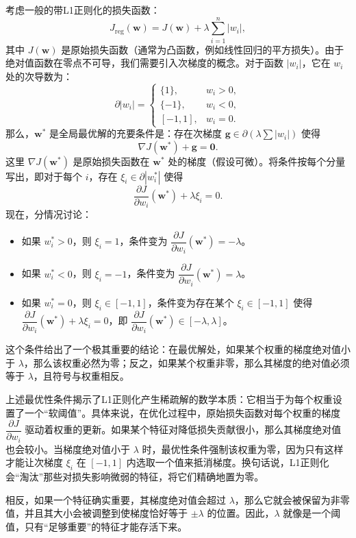 \documentclass[lang=cn,zihao=-4,a4paper,fontset=windows]{beautybook}
\renewcommand{\partial}{∂}
\begin{document}
考虑一般的带L1正则化的损失函数：
\[
J_{\text{reg}}(\mathbf{w}) = J(\mathbf{w}) + \lambda \sum_{i=1}^n |w_i|,
\]
其中 \(J(\mathbf{w})\) 是原始损失函数（通常为凸函数，例如线性回归的平方损失）。由于绝对值函数在零点不可导，我们需要引入次梯度的概念。对于函数 \(|w_i|\)，它在 \(w_i\) 处的次导数为：
\[
\partial |w_i| = 
\begin{cases}
\{1\}, & w_i > 0,\\
\{-1\}, & w_i < 0,\\
[-1, 1], & w_i = 0.
\end{cases}
\]
那么，\(\mathbf{w}^*\) 是全局最优解的充要条件是：存在次梯度 \(\mathbf{g} \in \partial (\lambda \sum |w_i|)\) 使得
\[
\nabla J(\mathbf{w}^*) + \mathbf{g} = \mathbf{0}.
\]
这里 \(\nabla J(\mathbf{w}^*)\) 是原始损失函数在 \(\mathbf{w}^*\) 处的梯度（假设可微）。将条件按每个分量写出，即对于每个 \(i\)，存在 \(\xi_i \in \partial |w_i^*|\) 使得
\[
\dfrac{\partial J}{\partial w_i}(\mathbf{w}^*) + \lambda \xi_i = 0.
\]
现在，分情况讨论：
\begin{itemize}
\item 如果 \(w_i^* > 0\)，则 \(\xi_i = 1\)，条件变为 \(\dfrac{\partial J}{\partial w_i}(\mathbf{w}^*) = -\lambda\)。
\item 如果 \(w_i^* < 0\)，则 \(\xi_i = -1\)，条件变为 \(\dfrac{\partial J}{\partial w_i}(\mathbf{w}^*) = \lambda\)。
\item 如果 \(w_i^* = 0\)，则 \(\xi_i \in [-1, 1]\)，条件变为存在某个 \(\xi_i \in [-1,1]\) 使得 \(\dfrac{\partial J}{\partial w_i}(\mathbf{w}^*) + \lambda \xi_i = 0\)，即 \(\dfrac{\partial J}{\partial w_i}(\mathbf{w}^*) \in [-\lambda, \lambda]\)。
\end{itemize}
这个条件给出了一个极其重要的结论：在最优解处，如果某个权重的梯度绝对值小于 \(\lambda\)，那么该权重必然为零；反之，如果某个权重非零，那么其梯度的绝对值必须等于 \(\lambda\)，且符号与权重相反。

上述最优性条件揭示了L1正则化产生稀疏解的数学本质：它相当于为每个权重设置了一个“软阈值”。具体来说，在优化过程中，原始损失函数对每个权重的梯度 \(\dfrac{\partial J}{\partial w_i}\) 驱动着权重的更新。如果某个特征对降低损失贡献很小，那么其梯度绝对值也会较小。当梯度绝对值小于 \(\lambda\) 时，最优性条件强制该权重为零，因为只有这样才能让次梯度 \(\xi_i\) 在 \([-1,1]\) 内选取一个值来抵消梯度。换句话说，L1正则化会“淘汰”那些对损失影响微弱的特征，将它们精确地置为零。

相反，如果一个特征确实重要，其梯度绝对值会超过 \(\lambda\)，那么它就会被保留为非零值，并且其大小会被调整到使梯度恰好等于 \(\pm \lambda\) 的位置。因此，\(\lambda\) 就像是一个阈值，只有“足够重要”的特征才能存活下来。
\end{document}
